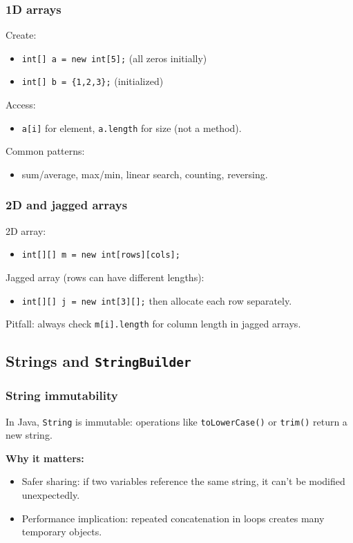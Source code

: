 \documentclass[11pt]{article}
\begin{document}
\subsubsection{1D arrays}
Create:
\begin{itemize}
  \item \texttt{int[] a = new int[5];} (all zeros initially)
  \item \texttt{int[] b = \{1,2,3\};} (initialized)
\end{itemize}
Access:
\begin{itemize}
  \item \texttt{a[i]} for element, \texttt{a.length} for size (not a method).
\end{itemize}
Common patterns:
\begin{itemize}
  \item sum/average, max/min, linear search, counting, reversing.
\end{itemize}

\subsubsection{2D and jagged arrays}
2D array:
\begin{itemize}
  \item \texttt{int[][] m = new int[rows][cols];}
\end{itemize}
Jagged array (rows can have different lengths):
\begin{itemize}
  \item \texttt{int[][] j = new int[3][];} then allocate each row separately.
\end{itemize}
Pitfall: always check \texttt{m[i].length} for column length in jagged arrays.

\subsection{Strings and \texttt{StringBuilder}}
\subsubsection{String immutability}
In Java, \texttt{String} is immutable: operations like \texttt{toLowerCase()} or \texttt{trim()} return a new string.

\textbf{Why it matters:}
\begin{itemize}
  \item Safer sharing: if two variables reference the same string, it can't be modified unexpectedly.
  \item Performance implication: repeated concatenation in loops creates many temporary objects.
\end{itemize}
\end{document}
